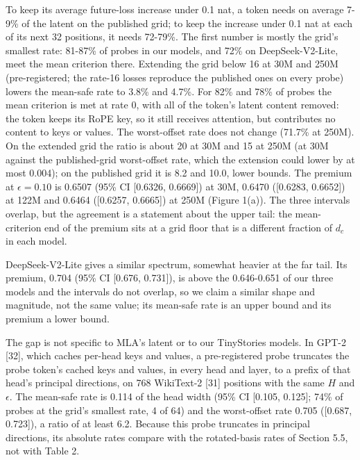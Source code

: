 \documentclass[10pt]{article}
\begin{document}
To keep its average future-loss increase under 0.1 nat, a token needs on average 7-9\% of the latent on the published grid; to keep the increase under 0.1 nat at each of its next 32 positions, it needs 72-79\%. The first number is mostly the grid's smallest rate: 81-87\% of probes in our models, and 72\% on DeepSeek-V2-Lite, meet the mean criterion there. Extending the grid below 16 at 30M and 250M (pre-registered; the rate-16 losses reproduce the published ones on every probe) lowers the mean-safe rate to 3.8\% and 4.7\%. For 82\% and 78\% of probes the mean criterion is met at rate 0, with all of the token's latent content removed: the token keeps its RoPE key, so it still receives attention, but contributes no content to keys or values. The worst-offset rate does not change (71.7\% at 250M). On the extended grid the ratio is about 20 at 30M and 15 at 250M (at 30M against the published-grid worst-offset rate, which the extension could lower by at most 0.004); on the published grid it is 8.2 and 10.0, lower bounds. The premium at $\epsilon=0.10$ is 0.6507 (95\% CI [0.6326, 0.6669]) at 30M, 0.6470 ([0.6283, 0.6652]) at 122M and 0.6464 ([0.6257, 0.6665]) at 250M (Figure 1(a)). The three intervals overlap, but the agreement is a statement about the upper tail: the mean-criterion end of the premium sits at a grid floor that is a different fraction of $d_c$ in each model.

DeepSeek-V2-Lite gives a similar spectrum, somewhat heavier at the far tail. Its premium, 0.704 (95\% CI [0.676, 0.731]), is above the 0.646-0.651 of our three models and the intervals do not overlap, so we claim a similar shape and magnitude, not the same value; its mean-safe rate is an upper bound and its premium a lower bound.

The gap is not specific to MLA's latent or to our TinyStories models. In GPT-2 [32], which caches per-head keys and values, a pre-registered probe truncates the probe token's cached keys and values, in every head and layer, to a prefix of that head's principal directions, on 768 WikiText-2 [31] positions with the same $H$ and $\epsilon$. The mean-safe rate is 0.114 of the head width (95\% CI [0.105, 0.125]; 74\% of probes at the grid's smallest rate, 4 of 64) and the worst-offset rate 0.705 ([0.687, 0.723]), a ratio of at least 6.2. Because this probe truncates in principal directions, its absolute rates compare with the rotated-basis rates of Section 5.5, not with Table 2.
\end{document}
